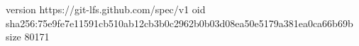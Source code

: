 version https://git-lfs.github.com/spec/v1
oid sha256:75e9fe7e11591cb510ab12cb3b0c2962b0b03d08ea50e5179a381ea0ca66b69b
size 80171
